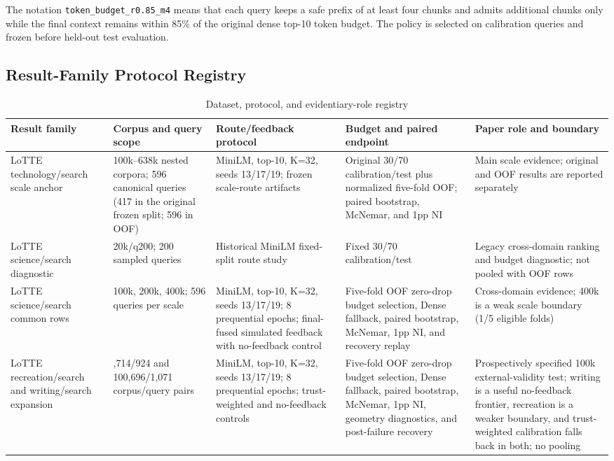 The notation \nolinkurl{token_budget_r0.85_m4} means that each query keeps a safe prefix of at least four chunks and admits additional chunks only while the final context remains within 85\% of the original dense top-10 token budget. The policy is selected on calibration queries and frozen before held-out test evaluation.

\subsection{Result-Family Protocol Registry}
\label{sec:12-appendix:result-family-protocol-registry}

\begin{table}[tbp]
\centering
\small
\caption{Dataset, protocol, and evidentiary-role registry}
\label{tab:s22}
\begin{tabularx}{\textwidth}{>{\raggedright\arraybackslash}X>{\raggedright\arraybackslash}X>{\raggedright\arraybackslash}X>{\raggedright\arraybackslash}X>{\raggedright\arraybackslash}X}
\toprule
Result family & Corpus and query scope & Route/feedback protocol & Budget and paired endpoint & Paper role and boundary \\
\midrule
LoTTE technology/search scale anchor & 100k--638k nested corpora; 596 canonical queries (417 in the original frozen split; 596 in OOF) & MiniLM, top-10, K=32, seeds 13/17/19; frozen scale-route artifacts & Original 30/70 calibration/test plus normalized five-fold OOF; paired bootstrap, McNemar, and 1pp NI & Main scale evidence; original and OOF results are reported separately \\
LoTTE science/search diagnostic & 20k/q200; 200 sampled queries & Historical MiniLM fixed-split route study & Fixed 30/70 calibration/test & Legacy cross-domain ranking and budget diagnostic; not pooled with OOF rows \\
LoTTE science/search common rows & 100k, 200k, 400k; 596 queries per scale & MiniLM, top-10, K=32, seeds 13/17/19; 8 prequential epochs; final-fused simulated feedback with no-feedback control & Five-fold OOF zero-drop budget selection, Dense fallback, paired bootstrap, McNemar, 1pp NI, and recovery replay & Cross-domain evidence; 400k is a weak scale boundary (1/5 eligible folds) \\
LoTTE recreation/search and writing/search expansion & 100,714/924 and 100,696/1,071 corpus/query pairs & MiniLM, top-10, K=32, seeds 13/17/19; 8 prequential epochs; trust-weighted and no-feedback controls & Five-fold OOF zero-drop budget selection, Dense fallback, paired bootstrap, McNemar, 1pp NI, geometry diagnostics, and post-failure recovery & Prospectively specified 100k external-validity test; writing is a useful no-feedback frontier, recreation is a weaker boundary, and trust-weighted calibration falls back in both; no pooling \\

\end{tabularx}
\end{table}
